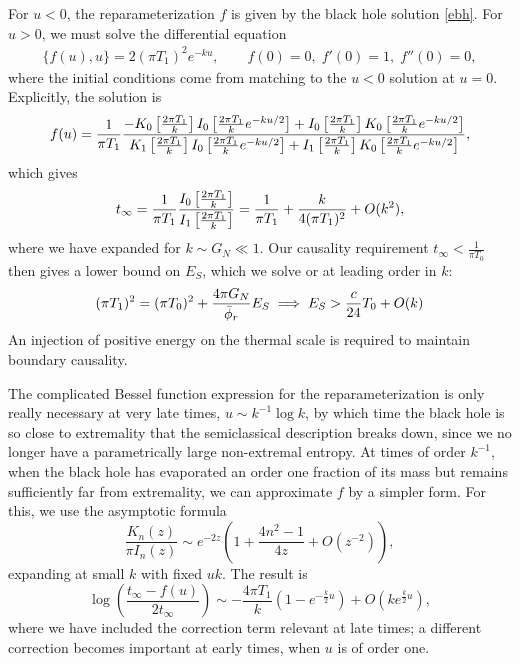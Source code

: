 \documentclass[12pt]{article}
\begin{document}
For $u<0$, the reparameterization $f$ is given by the black hole solution \eqref{ebh}. For $u>0$, we must solve the differential equation
\begin{align}
\{f(u), u \} = 2 (\pi T_1)^2 e^{- k u},\qquad f(0)=0,\; f'(0)=1,\; f''(0)=0,
\end{align}
where the initial conditions come from matching to the $u<0$ solution at $u=0$. Explicitly, the solution is
\begin{align}
f(u) = {1 \over \pi T_1}{ - K_0\left[  {2 \pi T_1 \over k}  \right] I_0\left[  {2 \pi T_1 \over k} e^{- k u/2}  \right] + I_0\left[  {2 \pi T_1 \over k}  \right] K_0\left[  {2 \pi T_1 \over k} e^{- k u/2}  \right]  \over  K_1\left[  {2 \pi T_1 \over k}   \right] I_0\left[  {2 \pi T_1 \over k} e^{- k u/2}  \right] + I_1\left[  {2 \pi T_1 \over k}   \right] K_0\left[  {2 \pi T_1 \over k} e^{- k u/2}  \right]},
\end{align}
which gives
\begin{equation}\label{eq:finfty}
t_\infty =  \frac{1}{\pi T_1}{  I_0\left[  {2 \pi T_1 \over k}  \right]   \over   I_1\left[  {2 \pi T_1 \over k}   \right] } = {1 \over \pi T_1} + \frac{k}{4 (\pi T_1)^2} +O(k^2),
\end{equation}
where we have expanded for $k\sim G_N \ll 1$. Our causality requirement $t_\infty < \frac{1}{\pi T_0}$ then gives a lower bound on $E_S$, which we solve or at leading order in $k$:
\begin{align}
{( \pi T_1)^2 }= {( \pi T_0)^2} + {4 \pi G_N \over \bar{\phi}_r} E_S  \implies E_S>\frac{c}{24}T_0 + O(k)
\end{align}
An injection of positive energy on the thermal scale is required to maintain boundary causality.

The complicated Bessel function expression for the reparameterization is only really necessary at very late times, $u\sim k^{-1}\log k$, by which time the black hole is so close to extremality that the semiclassical description breaks down, since we no longer have a parametrically large non-extremal entropy. At times of order $k^{-1}$, when the black hole has evaporated an order one fraction of its mass but remains sufficiently far from extremality, we can approximate $f$ by a simpler form. For this, we use the asymptotic formula
\begin{equation}
	\frac{K_n(z)}{\pi I_n(z)} \sim e^{-2z}\left(1+\frac{4n^2-1}{4z}+ O(z^{-2})\right),
\end{equation}
expanding at small $k$ with fixed $uk$. The result is
\begin{equation}\label{eq:LateReparam}
	\log\left(\frac{t_\infty-f(u)}{2t_\infty}\right) \sim -\frac{4\pi T_1}{k} \left(1-e^{-\frac{k}{2}u}\right) + O(k e^{\frac{k}{2}u}),
\end{equation}
where we have included the correction term relevant at late times; a different correction becomes important at early times, when $u$ is of order one.
\end{document}
